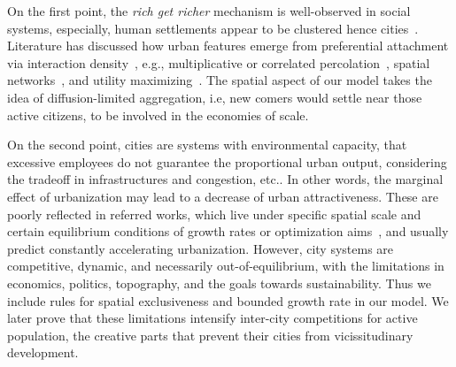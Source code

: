 \documentclass[reprint,unsortedaddress,amsmath,amssymb,aps,prl,showkeys]{revtex4-2}
\begin{document}
On the first point, the \textit{rich get richer} mechanism is well-observed in social systems, especially, human settlements appear to be clustered hence cities~\cite{marsili1998interacting}. Literature has discussed how urban features emerge from preferential attachment via interaction density~\cite{ccolak2016understanding,louf2014congestion,fujita1976spatial}, e.g., multiplicative or correlated percolation~\cite{makse1995modelling,PhysRevE.58.7054,rybski2013distance}, spatial networks~\cite{marsili1998interacting,court2013origins,Li2017Simple}, and utility maximizing~\cite{PhysRevE.90.042815,axtell2001emergent}. The spatial aspect of our model takes the idea of diffusion-limited aggregation\cite{makse1995modelling, rybski2013distance, kleinberg2000navigation}, i.e, new comers would settle near those active citizens, to be involved in the economies of scale.

On the second point, cities are systems with environmental capacity, that excessive employees do not guarantee the proportional urban output, considering the tradeoff in infrastructures and congestion, etc.. In other words, the marginal effect of urbanization may lead to a decrease of urban attractiveness\cite{atkinson2012urban, girardin2009quantifying,gomez2018explaining,parris2003characterizing,batty2008size}. These are poorly reflected in referred works, which live under specific spatial scale and certain equilibrium conditions of growth rates or optimization aims~\cite{zipf1949human}, and usually predict constantly accelerating urbanization. However, city systems are competitive, dynamic, and necessarily out-of-equilibrium, with the limitations in economics, politics, topography, and the goals towards sustainability\cite{fujita1976spatial,louf2014congestion,ccolak2016understanding}. Thus we include rules for spatial exclusiveness and bounded growth rate in our model. We later prove that these limitations  intensify inter-city competitions for active population\cite{batty2017urban}, the creative parts that prevent their cities from vicissitudinary development.
\end{document}
